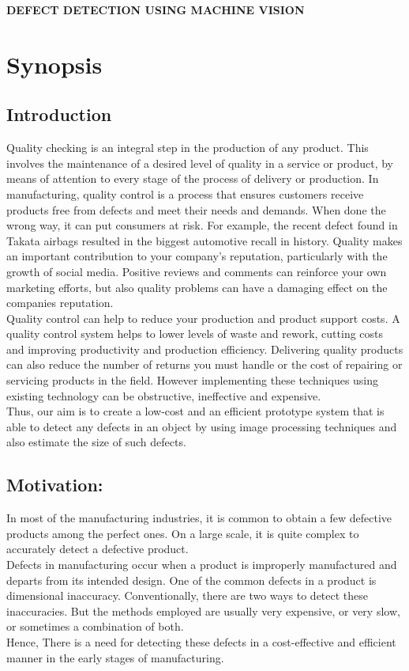 \documentclass[12pt]{article}
\begin{document}
\begin{Large}
\begin{center}
\textbf{DEFECT DETECTION USING MACHINE VISION}
\end{center}
\end{Large}

\section{Synopsis}
\subsection{Introduction}
\quad Quality checking is an integral step in the production of any product. This involves the maintenance of a desired level of quality in a service or product, by means of attention to every stage of the process of delivery or production.  In manufacturing, quality control is a process that ensures customers receive products free from defects and meet their needs and demands. When done the wrong way, it can put consumers at risk. For example, the recent defect found in Takata airbags resulted in the biggest automotive recall in history. Quality makes an important contribution to your company’s reputation, particularly with the growth of social media. Positive reviews and comments can reinforce your own marketing efforts, but also quality problems can have a damaging effect on the companies reputation.\\
\null{\quad}Quality control can help to reduce your production and product support costs. A quality control system helps to lower levels of waste and rework, cutting costs and improving productivity and production efficiency. Delivering quality products can also reduce the number of returns you must handle or the cost of repairing or servicing products in the field. However implementing these techniques using existing technology can be obstructive, ineffective and expensive.\\

{\quad}Thus, our aim is to create a low-cost and an efficient prototype system that is able to detect any defects in an object by using image processing techniques and also estimate the size of such defects.

\subsection{Motivation:}
{\quad}In most of the manufacturing industries, it is common to obtain a few defective products among the perfect ones. On a large scale, it is quite complex to accurately detect a defective product.\\
\null{\quad}Defects in manufacturing occur when a product is improperly manufactured and departs from its intended design. One of the common defects in a product is dimensional inaccuracy. Conventionally, there are two ways to detect these inaccuracies. But the methods employed are usually very expensive, or very slow, or sometimes a combination of both.
\\
\null{\quad}Hence, There is a need for detecting these defects in a cost-effective and efficient manner in the early stages of manufacturing.
\end{document}
